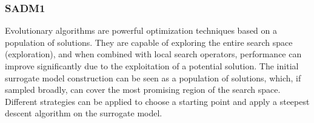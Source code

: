 			\subsubsection{SADM1}\label{chap:proposed-methodology:surrogate:algorithms:sadm1}
			
				
				Evolutionary algorithms are powerful optimization techniques based on a population of solutions. They are capable of exploring the entire search space (exploration), and when combined with local search operators, performance can improve significantly due to the exploitation of a potential solution. The initial surrogate model construction can be seen as a population of solutions, which, if sampled broadly, can cover the most promising region of the search space. Different strategies can be applied to choose a starting point and apply a steepest descent algorithm on the surrogate model.
				

